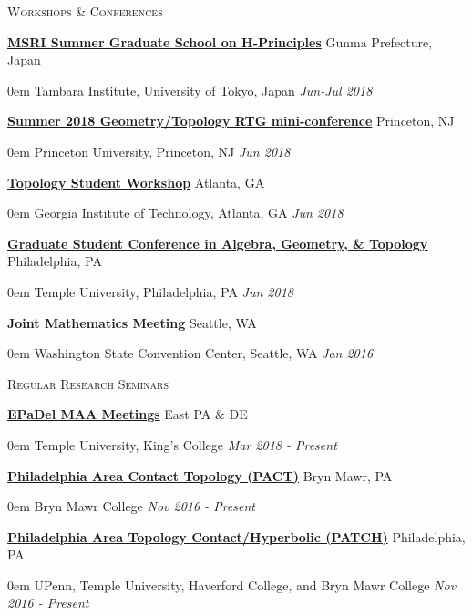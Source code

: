 \documentclass[11pt]{article}
\newenvironment{headitem}[2]{\vskip5pt \hspace{.5em} \textbf{#1} \hfill #2 \begin{addmargin}[0em]{0em}}{\end{addmargin}}
\renewenvironment{section}[1]{\textsc{\large #1}}{\vskip10pt}
\newcommand{\itemdate}[2]{\hspace{.5em} #1 \hfill \textit{#2} \\}
\begin{document}
\begin{section}{Workshops \& Conferences}

	\begin{headitem}{\href{http://www.msri.org/web/msri/scientific/workshops/summer-graduate-school}{MSRI Summer Graduate School on H-Principles}}{Gunma Prefecture, Japan}
		\itemdate{Tambara Institute, University of Tokyo, Japan}{Jun-Jul 2018}
	\end{headitem}
	
	\begin{headitem}{\href{https://web.math.princeton.edu/~petero/RTG/MiniConf1.html}{Summer 2018 Geometry/Topology RTG mini-conference}}{Princeton, NJ}
		\itemdate{Princeton University, Princeton, NJ}{Jun 2018}
	\end{headitem}
	
	\begin{headitem}{\href{http://people.math.gatech.edu/~dmargalit7/tsw18/index.shtml}{Topology Student Workshop}}{Atlanta, GA}
		\itemdate{Georgia Institute of Technology, Atlanta, GA}{Jun 2018}
	\end{headitem}
	
	\begin{headitem}{\href{https://math.temple.edu/events/conferences/gscagt/}{Graduate Student Conference in Algebra, Geometry, \& Topology}}{Philadelphia, PA}
		\itemdate{Temple University, Philadelphia, PA}{Jun 2018}
	\end{headitem}

	\begin{headitem}{Joint Mathematics Meeting}{Seattle, WA}
		\itemdate{Washington State Convention Center, Seattle, WA}{Jan 2016}
	\end{headitem}

\end{section}



\begin{section}{Regular Research Seminars}
	
	\begin{headitem}{\href{http://sections.maa.org/epadel/}{EPaDel MAA Meetings}}{East PA \& DE}
		\itemdate{Temple University, King's College}{Mar 2018 - Present}
	\end{headitem}
	
	\begin{headitem}{\href{https://www.brynmawr.edu/math/pact-seminar}{Philadelphia Area Contact Topology (PACT)}}{Bryn Mawr, PA}
		\itemdate{Bryn Mawr College}{Nov 2016 - Present}
	\end{headitem}
	
	\begin{headitem}{\href{https://math.temple.edu/events/seminars/geometry/}{Philadelphia Area Topology Contact/Hyperbolic (PATCH)}}{Philadelphia, PA}
		\itemdate{UPenn, Temple University, Haverford College, and Bryn Mawr College}{Nov 2016 - Present}
	\end{headitem}
	
\end{section}
\end{document}
